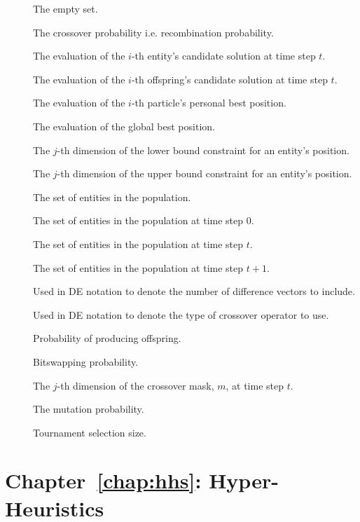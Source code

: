 \begin{description}
	\item [\parbox{2cm}{$\emptyset$}] The empty set.
	\item [\parbox{2cm}{$p_{r}$}] The crossover probability i.e. recombination probability.
	\item [\parbox{2cm}{$f(\boldsymbol{x}_{i}(t))$}] The evaluation of the $i$-th entity's candidate solution at time step $t$.
	\item [\parbox{2cm}{$f(\boldsymbol{x}'_{i}(t))$}] The evaluation of the $i$-th offspring's candidate solution at time step $t$.
	\item [\parbox{2cm}{$f(\boldsymbol{y}_{i})$}] The evaluation of the $i$-th particle's personal best position.
	\item [\parbox{2cm}{$f(\boldsymbol{\hat{y}})$}] The evaluation of the global best position.
	\item [\parbox{2cm}{$x_{min,j}$}] The $j$-th dimension of the lower bound constraint for an entity's position.
	\item [\parbox{2cm}{$x_{max,j}$}] The $j$-th dimension of the upper bound constraint for an entity's position.
	\item [\parbox{2cm}{$\mathcal{C}$}] The set of entities in the population.
	\item [\parbox{2cm}{$\mathcal{C}(0)$}] The set of entities in the population at time step $0$.
	\item [\parbox{2cm}{$\mathcal{C}(t)$}] The set of entities in the population at time step $t$.
	\item [\parbox{2cm}{$\mathcal{C}(t+1)$}] The set of entities in the population at time step $t+1$.
	\item [\parbox{2cm}{$y$}] Used in \acs{DE} notation to denote the number of difference vectors to include.
	\item [\parbox{2cm}{$z$}] Used in \acs{DE} notation to denote the type of crossover operator to use.
	\item [\parbox{2cm}{$p_{c}$}] Probability of producing offspring.
	\item [\parbox{2cm}{$p_{x}$}] Bitswapping probability.
	\item [\parbox{2cm}{$m_{j}(t)$}] The $j$-th dimension of the crossover mask, $m$, at time step $t$.
	\item [\parbox{2cm}{$p_{m}$}] The mutation probability.
	\item [\parbox{2cm}{$N_{t}$}] Tournament selection size.
\end{description}

\section{Chapter~\ref{chap:hhs}: Hyper-Heuristics}
\label{sec:symbols:hhs}


